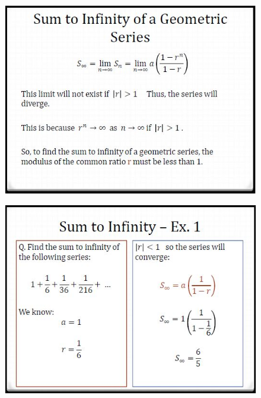 \documentclass{beamer}
\begin{document}
\begin{frame}
	\begin{figure}
		\centering
		\includegraphics[width=0.99\linewidth]{SeqSer21E}
	\end{figure}
	
\end{frame}	
\begin{frame}
	\begin{figure}
		\centering
		\includegraphics[width=0.99\linewidth]{SeqSer21F}
	\end{figure}
	
\end{frame}
\end{document}
